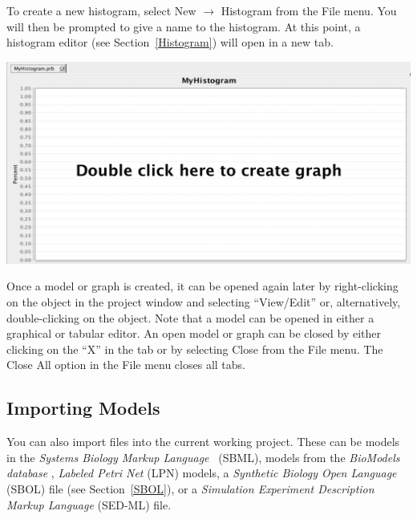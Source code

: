 \documentclass[titlepage,11pt]{article}
\begin{document}
To create a new histogram, select New $\rightarrow$ Histogram from the File menu. You will then be prompted to give a name to the histogram.  At this point, a histogram editor (see Section~\ref{Histogram}) will open in a new tab.  

\begin{center}
\includegraphics[width=160mm]{screenshots/Histogram}
\end{center}

Once a model or graph is created, it can be opened again later by right-clicking on the object in the project window and selecting ``View/Edit'' or, alternatively, double-clicking on the object.  Note that a model can be opened in either a graphical or tabular editor.  An open model or graph can be closed by either clicking on the ``X'' in the tab or by selecting Close from the File menu.  The Close All option in the File menu closes all tabs.

\clearpage

\subsection{Importing Models}

\noindent
You can also import files into the current working project.  These can be models in the 
\emph{Systems Biology Markup Language}
~(SBML), models from the
\emph{BioModels database}
, \emph{Labeled Petri Net} (LPN) models, a 
\emph{Synthetic Biology Open Language}
(SBOL) file (see Section~\ref{SBOL}), or a 
\emph{Simulation Experiment Description Markup Language}
(SED-ML) file. 
\end{document}
